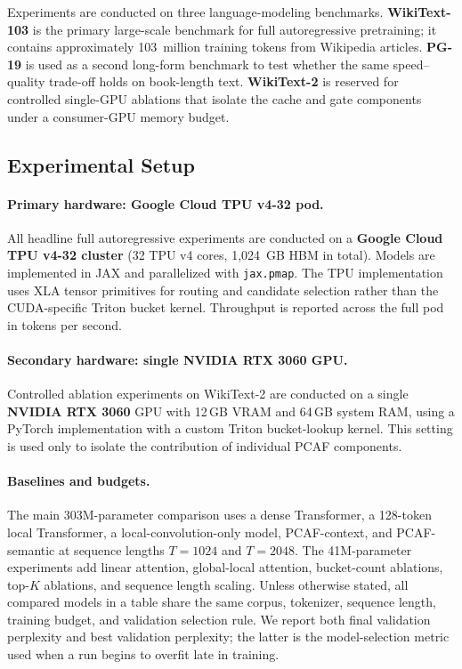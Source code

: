 \documentclass[11pt]{article}
\begin{document}
Experiments are conducted on three language-modeling benchmarks.
\textbf{WikiText-103} \citep{merity2016pointer} is the primary large-scale
benchmark for full autoregressive pretraining; it contains approximately
103~million training tokens from Wikipedia articles. \textbf{PG-19} is used as
a second long-form benchmark to test whether the same speed--quality trade-off
holds on book-length text. \textbf{WikiText-2} \citep{merity2016pointer} is
reserved for controlled single-GPU ablations that isolate the cache and gate
components under a consumer-GPU memory budget.

\subsection{Experimental Setup}

\paragraph{Primary hardware: Google Cloud TPU v4-32 pod.}
All headline full autoregressive experiments are conducted on a
\textbf{Google Cloud TPU v4-32 cluster} (32 TPU v4 cores, 1,024~GB HBM in
total). Models are implemented in JAX and parallelized with \texttt{jax.pmap}.
The TPU implementation uses XLA tensor primitives for routing and candidate
selection rather than the CUDA-specific Triton bucket kernel. Throughput is
reported across the full pod in tokens per second.

\paragraph{Secondary hardware: single NVIDIA RTX 3060 GPU.}
Controlled ablation experiments on WikiText-2 are conducted on a single
\textbf{NVIDIA RTX 3060} GPU with 12\,GB VRAM and 64\,GB system RAM, using a
PyTorch implementation with a custom Triton bucket-lookup kernel. This setting
is used only to isolate the contribution of individual PCAF components.

\paragraph{Baselines and budgets.}
The main 303M-parameter comparison uses a dense Transformer, a 128-token local
Transformer, a local-convolution-only model, PCAF-context, and PCAF-semantic at
sequence lengths $T{=}1024$ and $T{=}2048$. The 41M-parameter experiments add
linear attention, global-local attention, bucket-count ablations, top-$K$
ablations, and sequence length scaling. Unless otherwise stated, all compared
models in a table share the same corpus, tokenizer, sequence length, training
budget, and validation selection rule. We report both final validation
perplexity and best validation perplexity; the latter is the model-selection
metric used when a run begins to overfit late in training.
\end{document}
